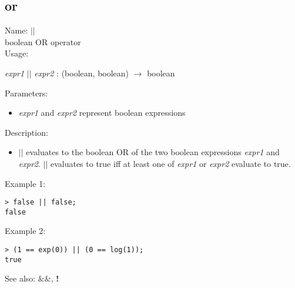 \subsection{ or }
\noindent Name: \textbf{$||$}\\
boolean OR operator\\

\noindent Usage: 
\begin{center}
\emph{expr1} \textbf{$||$} \emph{expr2} : (\textsf{boolean}, \textsf{boolean}) $\rightarrow$ \textsf{boolean}\\
\end{center}
Parameters: 
\begin{itemize}
\item \emph{expr1} and \emph{expr2} represent boolean expressions
\end{itemize}
\noindent Description: \begin{itemize}

\item \textbf{$||$} evaluates to the boolean OR of the two
   boolean expressions \emph{expr1} and \emph{expr2}. \textbf{$||$} evaluates to 
   true iff at least one of \emph{expr1} or \emph{expr2} evaluate to true.
\end{itemize}
\noindent Example 1: 
\begin{center}\begin{minipage}{15cm}\begin{Verbatim}[frame=single]
> false || false;
false
\end{Verbatim}
\end{minipage}\end{center}
\noindent Example 2: 
\begin{center}\begin{minipage}{15cm}\begin{Verbatim}[frame=single]
> (1 == exp(0)) || (0 == log(1));
true
\end{Verbatim}
\end{minipage}\end{center}
See also: \textbf{$\&\&$}, \textbf{!}
